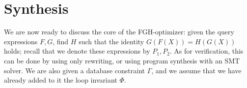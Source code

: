 
%



\section{Synthesis}

\label{subsec:synthesis}


%
We are now ready to discuss the core of the FGH-optimizer: given 
the query expressions $F, G$, find $H$ such that the
identity $G(F(X)) = H(G(X))$ holds; recall that we denote these
expressions by $P_1, P_2$. As for verification, this can be done by
using only rewriting, or using program synthesis with an SMT solver.
We are also given a database constraint $\Gamma$, and we assume that
 we have already added to it the loop invariant $\Phi$.



